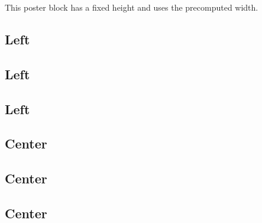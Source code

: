 \documentclass[a4paper, 11pt]{article}
\let \oldsection \section
\renewcommand{\section}{\vspace{-10pt}\oldsection}
\begin{document}
\begin{poster}
\begin{posterrows}[3]
        \begin{posterblockH}{30}
            This poster block has a fixed height and uses the precomputed width.
        \end{posterblockH}

    \end{posterrows}

    \begin{postercolumns}[5]
        \begin{posterblock}
            \section{Left}
        \end{posterblock}
        \begin{posterblock}
            \section{Left}
        \end{posterblock}
        \begin{posterblock}
            \section{Left}
        \end{posterblock}

        \posternextcolumn
        \posternextcolumn

        \begin{posterblock}
            \section{Center}
        \end{posterblock}
        \begin{posterblock}
            \section{Center}
        \end{posterblock}
        \begin{posterblock}
            \section{Center}
        \end{posterblock}

        \posternextcolumn
        \posternextcolumn


\end{postercolumns}
\end{poster}
\end{document}
